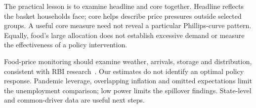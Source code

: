 \documentclass[10pt,a4paper]{article}
\begin{document}
The practical lesson is to examine headline and core together. Headline reflects the basket households face; core helps describe price pressures outside selected groups. A useful core measure need not reveal a particular Phillips-curve pattern. Equally, food's large allocation does not establish excessive demand or measure the effectiveness of a policy intervention.

Food-price monitoring should examine weather, arrivals, storage and distribution, consistent with RBI research~\cite{mohan2026,patra2024}. Our estimates do not identify an optimal policy response. Pandemic leverage, overlapping inflation and omitted expectations limit the unemployment comparison; low power limits the spillover findings. State-level and common-driver data are useful next steps.
\label{main:last}
\end{document}
